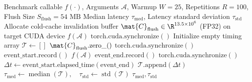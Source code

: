 \begin{algorithm}[h]
\caption[Cold-Cache Microbenchmarking Protocol with Active L2 Invalidation]{Cold-Cache Microbenchmarking Protocol with Active L2 Invalidation}
\label{alg:cold_cache}
\begin{algorithmic}[1]
\REQUIRE Benchmark callable $f(\cdot)$, Arguments $\mathcal{A}$, Warmup $W=25$, Repetitions $R=100$, Flush Size $S_{\text{flush}}=54\text{ MB}$
\ENSURE Median latency $\tau_{\text{med}}$, Latency standard deviation $\tau_{\text{std}}$
\STATE Allocate cold-cache invalidation buffer $\mat{C}_{\text{flush}} \in \R^{13.5 \times 10^6}$ (FP32) on target CUDA device
    \STATE $f(\mathcal{A})$ 
\ENDFOR
\STATE $\text{torch.cuda.synchronize}()$
\STATE Initialize empty timing array $\mathcal{T} \leftarrow []$
    \STATE $\mat{C}_{\text{flush}}.\text{zero\_}()$ 
    \STATE $\text{torch.cuda.synchronize}()$
    \STATE $\text{event\_start}.\text{record}()$
    \STATE $f(\mathcal{A})$
    \STATE $\text{event\_end}.\text{record}()$
    \STATE $\text{torch.cuda.synchronize}()$
    \STATE $\Delta t \leftarrow \text{event\_start}.\text{elapsed\_time}(\text{event\_end})$ 
    \STATE $\mathcal{T}.\text{append}(\Delta t)$
\ENDFOR
\STATE $\tau_{\text{med}} \leftarrow \operatorname{median}(\mathcal{T}), \quad \tau_{\text{std}} \leftarrow \operatorname{std}(\mathcal{T})$
\RETURN $\tau_{\text{med}}, \tau_{\text{std}}$
\end{algorithmic}
\end{algorithm}

